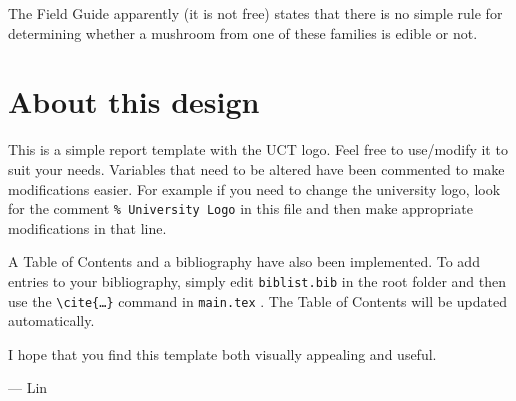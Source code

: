 \documentclass[12pt]{book}
\begin{document}
The Field Guide apparently (it is not free) states that there is no simple rule for determining whether a mushroom from one of these families is edible or not.

\section{About this design}
This is a simple report template with the UCT logo. Feel free to use/modify it to suit your needs. Variables that need to be altered have been commented to make modifications easier. For example if you need to change the university logo, look for the comment \texttt{\% University Logo} in this file and then make appropriate modifications in that line.

A Table of Contents and a bibliography have also been implemented. To add entries to your bibliography, simply edit \texttt{biblist.bib} in the root folder and then use the \texttt{\textbackslash cite\{\ldots\}} command in \texttt{main.tex} \cite{bibtex}. The Table of Contents will be updated automatically.

I hope that you find this template both visually appealing and useful.

\hspace{1 cm}--- Lin

\newpage


\end{document}
